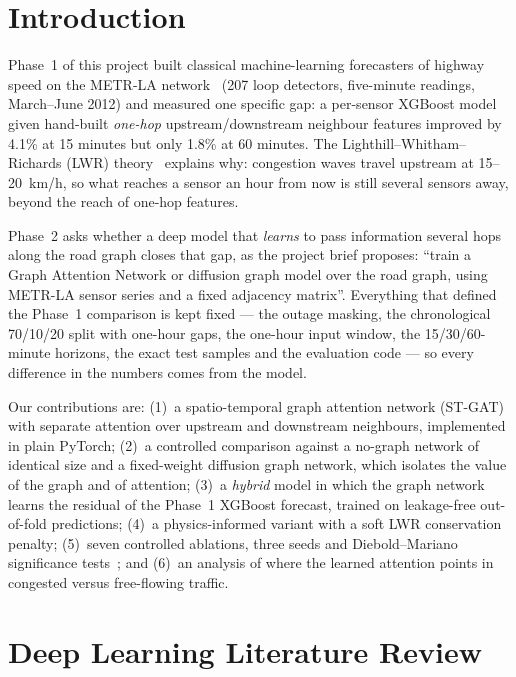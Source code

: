 \section{Introduction}
Phase~1 of this project built classical machine-learning forecasters of highway speed on the METR-LA network~\cite{li2018dcrnn} (207 loop detectors, five-minute readings, March--June 2012) and measured one specific gap: a per-sensor XGBoost model given hand-built \emph{one-hop} upstream/downstream neighbour features improved by 4.1\% at 15 minutes but only 1.8\% at 60 minutes. The Lighthill--Whitham--Richards (LWR) theory~\cite{lighthill1955kinematic,richards1956shock} explains why: congestion waves travel upstream at 15--20~km/h, so what reaches a sensor an hour from now is still several sensors away, beyond the reach of one-hop features.

Phase~2 asks whether a deep model that \emph{learns} to pass information several hops along the road graph closes that gap, as the project brief proposes: ``train a Graph Attention Network or diffusion graph model over the road graph, using METR-LA sensor series and a fixed adjacency matrix''. Everything that defined the Phase~1 comparison is kept fixed --- the outage masking, the chronological 70/10/20 split with one-hour gaps, the one-hour input window, the 15/30/60-minute horizons, the exact test samples and the evaluation code --- so every difference in the numbers comes from the model.

Our contributions are: (1)~a spatio-temporal graph attention network (ST-GAT) with separate attention over upstream and downstream neighbours, implemented in plain PyTorch; (2)~a controlled comparison against a no-graph network of identical size and a fixed-weight diffusion graph network, which isolates the value of the graph and of attention; (3)~a \emph{hybrid} model in which the graph network learns the residual of the Phase~1 XGBoost forecast, trained on leakage-free out-of-fold predictions; (4)~a physics-informed variant with a soft LWR conservation penalty; (5)~seven controlled ablations, three seeds and Diebold--Mariano significance tests~\cite{diebold1995dm}; and (6)~an analysis of where the learned attention points in congested versus free-flowing traffic.

\section{Deep Learning Literature Review}
